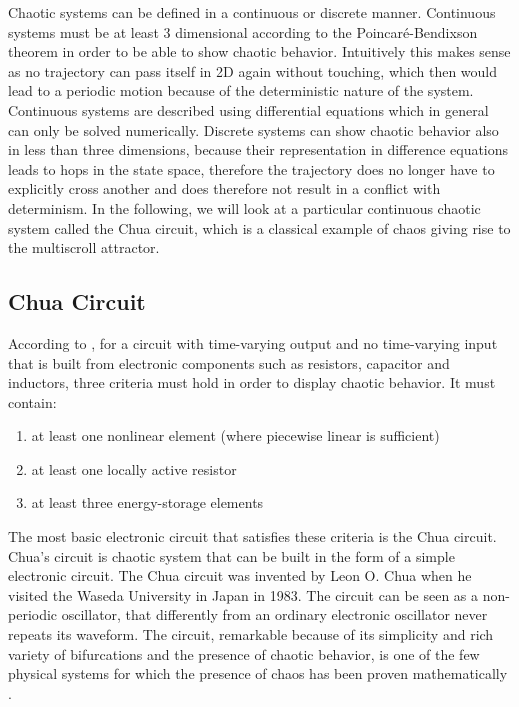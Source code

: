 \documentclass[main]{subfiles}
\begin{document}
Chaotic systems can be defined in a continuous or discrete manner. %
%
Continuous systems must be at least 3 dimensional according to the Poincaré-Bendixson theorem \cite{bib:Bendixon1901} in order to be able to show chaotic behavior. %
%
Intuitively this makes sense as no trajectory can pass itself in 2D again without touching, which then would lead to a periodic motion because of the deterministic nature of the system. %
%
Continuous systems are described using differential equations which in general can only be solved numerically. %
%
Discrete systems can show chaotic behavior also in less than three dimensions, because their representation in difference equations leads to hops in the state space, therefore the trajectory does no longer have to explicitly cross another and does therefore not result in a conflict with determinism. %
%
In the following, we will look at a particular continuous chaotic system called the Chua circuit, which is a classical example of chaos giving rise to the multiscroll attractor.

\subsection{Chua Circuit}
\label{subsec:chua-circuit}

According to \cite{bib:Kennedy1993}, for a circuit with time-varying output and no time-varying input that is built from electronic components such as resistors, capacitor and inductors, three criteria must hold in order to display chaotic behavior. %
%
It must contain:
\begin{enumerate}
  \item at least one nonlinear element (where piecewise linear is sufficient)
  \item at least one locally active resistor
  \item at least three energy-storage elements
\end{enumerate}
  
The most basic electronic circuit that satisfies these criteria is the Chua circuit. %
%
Chua's circuit is chaotic system that can be built in the form of a simple electronic circuit. %
%
The Chua circuit was invented by Leon O. Chua when he visited the Waseda University in Japan in 1983. %
%
The circuit can be seen as a non-periodic oscillator, that differently from an ordinary electronic oscillator never repeats its waveform. %
%
The circuit, remarkable because of its simplicity and rich variety of bifurcations and the presence of chaotic behavior, is one of the few physical systems for which the presence of chaos has been proven mathematically \cite{bib:Kennedy1993}.
\end{document}
